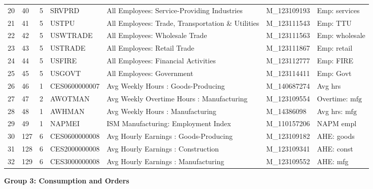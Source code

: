\begin{landscape}
\begin{singlespace}
\begin{longtable}{rlrllll}
 20 & 40 & 5 & SRVPRD & All Employees: Service-Providing Industries & M\_123109193 & Emp: services \\
 21 & 41 & 5 & USTPU & All Employees: Trade, Transportation \& Utilities & M\_123111543 & Emp: TTU \\
 22 & 42 & 5 & USWTRADE & All Employees: Wholesale Trade & M\_123111563 & Emp: wholesale \\
 23 & 43 & 5 & USTRADE & All Employees: Retail Trade & M\_123111867 & Emp: retail \\
 24 & 44 & 5 & USFIRE & All Employees: Financial Activities & M\_123112777 & Emp: FIRE \\
 25 & 45 & 5 & USGOVT & All Employees: Government & M\_123114411 & Emp: Govt \\
 26 & 46 & 1 & CES0600000007 & Avg Weekly Hours : Goods-Producing & M\_140687274 & Avg hrs \\
 27 & 47 & 2 & AWOTMAN & Avg Weekly Overtime Hours : Manufacturing & M\_123109554 & Overtime: $\mathrm{mfg}$ \\
 28 & 48 & 1 & AWHMAN & Avg Weekly Hours : Manufacturing & M\_14386098 & Avg hrs: $\mathrm{mfg}$ \\
 29 & 49 & 1 & NAPMEI & ISM Manufacturing: Employment Index & M\_110157206 & NAPM empl \\
 30 & 127 & 6 & CES0600000008 & Avg Hourly Earnings : Goods-Producing & M\_123109182 & AHE: goods \\
 31 & 128 & 6 & CES2000000008 & Avg Hourly Earnings : Construction & M\_123109341 & AHE: const \\
 32 & 129 & 6 & CES3000000008 & Avg Hourly Earnings : Manufacturing & M\_123109552 & AHE: mfg \\
\hline
\end{longtable}


\begin{center}
   \textbf{Group 3: Consumption and Orders}
\end{center}


\end{singlespace}
\end{landscape}
